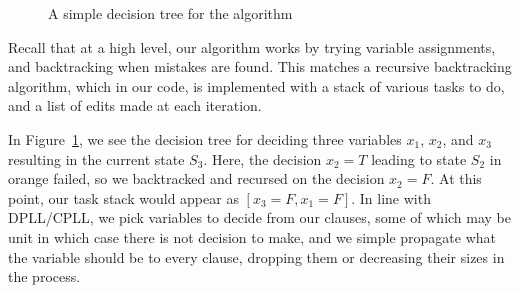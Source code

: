\documentclass{article}
\begin{document}
\begin{figure}
    \begin{center}
    \end{center}
    \caption{A simple decision tree for the algorithm}
    \label{fig:dec-tree}
\end{figure}

Recall that at a high level, our algorithm works by trying variable assignments, and backtracking when mistakes are found. This matches a recursive backtracking algorithm, which in our code, is implemented with a stack of various tasks to do, and a list of edits made at each iteration. 

In Figure~\ref{fig:dec-tree}, we see the decision tree for deciding three variables $x_1$, $x_2$, and $x_3$ resulting in the current state $S_3$. Here, the decision $x_2 = T$ leading to state $S_2$ in orange failed, so we backtracked and recursed on the decision $x_2 = F$. At this point, our task stack would appear as $\left[x_3 = F, x_1 = F\right]$. In line with DPLL/CPLL, we pick variables to decide from our clauses, some of which may be unit in which case there is not decision to make, and we simple propagate what the variable should be to every clause, dropping them or decreasing their sizes in the process.
\end{document}
